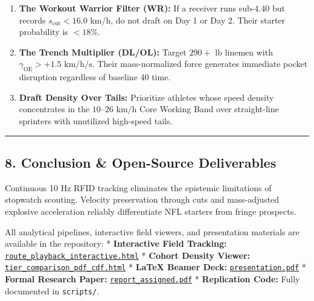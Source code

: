\documentclass[
  letterpaper,
  DIV=11,
  numbers=noendperiod]{scrartcl}
\providecommand{\tightlist}{%
  \setlength{\itemsep}{0pt}\setlength{\parskip}{0pt}}
\begin{document}
\begin{enumerate}
\def\labelenumi{\arabic{enumi}.}
\tightlist
\item
  \textbf{The Workout Warrior Filter (WR):} If a receiver runs sub-4.40
  but records \(s_{\text{cut}} < 16.0\text{ km/h}\), do not draft on Day
  1 or Day 2. Their starter probability is \(<18\%\).
\item
  \textbf{The Trench Multiplier (DL/OL):} Target \(290+\text{ lb}\)
  linemen with \(\gamma_{\text{OE}} > +1.5\text{ km/h/s}\). Their
  mass-normalized force generates immediate pocket disruption regardless
  of baseline 40 time.
\item
  \textbf{Draft Density Over Tails:} Prioritize athletes whose speed
  density concentrates in the \(10\text{--}26\text{ km/h}\) Core Working
  Band over straight-line sprinters with unutilized high-speed tails.
\end{enumerate}

\begin{center}\rule{0.5\linewidth}{0.5pt}\end{center}

\subsection{8. Conclusion \& Open-Source
Deliverables}\label{conclusion-open-source-deliverables}

Continuous 10 Hz RFID tracking eliminates the epistemic limitations of
stopwatch scouting. Velocity preservation through cuts and mass-adjusted
explosive acceleration reliably differentiate NFL starters from fringe
prospects.

All analytical pipelines, interactive field viewers, and presentation
materials are available in the repository: * \textbf{Interactive Field
Tracking:}
\href{route_playback_interactive.html}{\texttt{route\_playback\_interactive.html}}
* \textbf{Cohort Density Viewer:}
\href{tier_comparison_pdf_cdf.html}{\texttt{tier\_comparison\_pdf\_cdf.html}}
* \textbf{LaTeX Beamer Deck:}
\href{presentation.pdf}{\texttt{presentation.pdf}} * \textbf{Formal
Research Paper:}
\href{report_assigned.pdf}{\texttt{report\_assigned.pdf}} *
\textbf{Replication Code:} Fully documented in \texttt{scripts/}.
\end{document}
